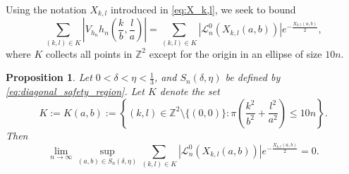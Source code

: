 \documentclass[11pt]{amsart}
\numberwithin{equation}{section}
\newtheorem{proposition}[theorem]{Proposition}
\newcommand{\Z}{{\mathbb Z}}
\begin{document}
Using the notation $X_{k,l}$ introduced in \eqref{eq:X_k,l}, we seek to bound
\begin{equation}
    \sum_{(k,l)\in K} \left|V_{h_n} h_n \left( \frac{k}{b},\frac{l}{a} \right) \right| = \sum_{(k,l)\in K}|\mathcal{L}^{0}_n (X_{k,l}(a,b))|e^{-\frac{X_{k,l}(a,b)}{2}},
\end{equation}
where $K$ collects all points in $\Z^2$ except for the origin in an ellipse of size $10n$.

\begin{proposition}\label{pro:Janssen_main}
    Let $0< \delta < \eta < \frac{1}{3}$, and $S_n(\delta,\eta)$ be defined by \eqref{eq:diagonal_safety_region}. Let $K$ denote the set
    \begin{equation}\label{eq:K_set_def}
        K := K(a,b):= \left\{(k,l)\in\Z^2\setminus\{(0,0)\}:\pi \left( \frac{k^2}{b^2}+\frac{l^2}{a^2} \right) \leq 10n\right\}.
    \end{equation}
    Then
    \begin{equation}
        \lim\limits_{n\to\infty} \sup\limits_{(a,b) \in S_n(\delta, \eta)} \sum_{(k,l)\in K} |\mathcal{L}^{0}_n(X_{k,l}(a,b))| e^{-\frac{X_{k,l}(a,b)}{2}} = 0.
    \end{equation}
\end{proposition}
\end{document}
